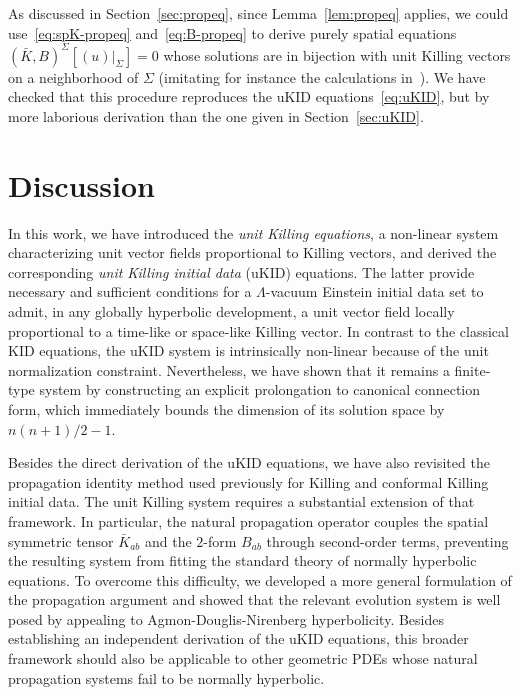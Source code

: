 \documentclass[a4paper]{article}
\theoremstyle{remark}
\begin{document}
As discussed in Section~\eqref{sec:propeq}, since
Lemma~\eqref{lem:propeq} applies, we could use~\eqref{eq:spK-propeq}
and~\eqref{eq:B-propeq} to derive purely spatial equations $(\bar{K},
B)^\Sigma[(u)|_\Sigma] = 0$ whose solutions are in bijection with unit
Killing vectors on a neighborhood of $\Sigma$ (imitating for instance
the calculations in~\cite{khgp-ckid}). We have checked that this
procedure reproduces the uKID equations~\eqref{eq:uKID}, but by more
laborious derivation than the one given in Section~\ref{sec:uKID}.%

\section{Discussion} \label{sec:discussion}

In this work, we have introduced the \emph{unit Killing equations}, a non-linear system
characterizing unit vector fields proportional to Killing vectors, and
derived the corresponding \emph{unit Killing initial data} (uKID)
equations. The latter provide necessary and sufficient conditions for a
$\Lambda$-vacuum Einstein initial data set to admit, in any globally
hyperbolic development, a unit vector field locally proportional to a
time-like or space-like Killing vector. In contrast to the classical KID
equations, the uKID system is intrinsically non-linear because of the
unit normalization constraint. Nevertheless, we have shown that it
remains a finite-type system by constructing an explicit prolongation to
canonical connection form, which immediately bounds the dimension of its
solution space by $n(n+1)/2-1$.

Besides the direct derivation of the uKID equations, we have also
revisited the propagation identity method used previously for Killing
and conformal Killing initial data. The unit Killing system requires a
substantial extension of that framework. In particular, the natural
propagation operator couples the spatial symmetric tensor
$\bar{K}_{ab}$ and the $2$-form $B_{ab}$ through second-order terms,
preventing the resulting system from fitting the standard theory of
normally hyperbolic equations. To overcome this difficulty, we developed
a more general formulation of the propagation argument and showed that
the relevant evolution system is well posed by appealing to
Agmon-Douglis-Nirenberg hyperbolicity. Besides establishing an independent derivation of the
uKID equations, this broader framework should also be applicable to
other geometric PDEs whose natural propagation systems fail to be
normally hyperbolic.
\end{document}
